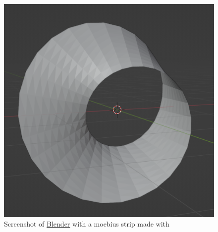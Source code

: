 \begin{figure}[t]
    \centering
    \includegraphics[scale=0.35]{img/moebius_2023-05-23.png}
    \caption{Screenshot of \href{https://www.blender.org/}{Blender} with a moebius strip made with \maniflow{}}
    \label{fig:moubius_blender}
\end{figure}
\newpage
